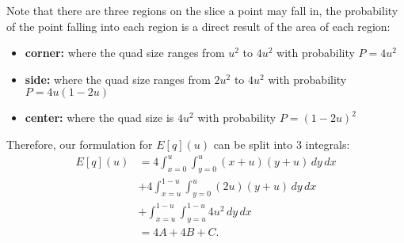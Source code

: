Note that there are three regions on the slice a point may fall in,
the probability of the point falling into each region is a direct result
of the area of each region:

\begin{itemize}
\item {\bf corner:} where the quad size ranges from $u^2$ to $4u^2$
                    with probability $P = 4u^2$
\item {\bf side:}   where the quad size ranges from $2u^2$ to $4u^2$ 
                    with probability $P = 4u(1-2u)$
\item {\bf center:} where the quad size is $4u^2$
                    with probability $P = (1-2u)^2$
\end{itemize}

Therefore, our formulation for $E[q](u)$ can be split into 3 integrals:
\begin{align*}
  E[q](u) &=   4 \int_{x=0}^u \int_{y=0}^u (x+u)(y+u) \, dy \, dx     \\
           & + 4 \int_{x=u}^{1-u} \int_{y=0}^u (2u)(y+u) \, dy \, dx \\
           & + \int_{x=u}^{1-u} \int_{y=u}^{1-u} 4u^2 \, dy \, dx    \\
          &= 4A + 4B + C
          \text{.}
\end{align*}

